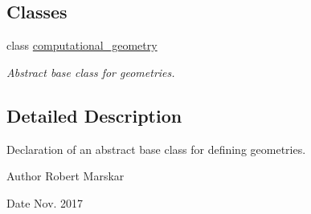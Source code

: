 \subsection*{Classes}
\begin{DoxyCompactItemize}
\item 
class \hyperlink{classcomputational__geometry}{computational\+\_\+geometry}
\begin{DoxyCompactList}\small\item\em Abstract base class for geometries. \end{DoxyCompactList}\end{DoxyCompactItemize}


\subsection{Detailed Description}
Declaration of an abstract base class for defining geometries. 

\begin{DoxyAuthor}{Author}
Robert Marskar 
\end{DoxyAuthor}
\begin{DoxyDate}{Date}
Nov. 2017 
\end{DoxyDate}
